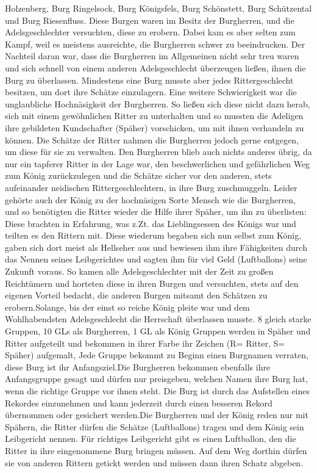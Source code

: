 Holzenberg, Burg Ringelsock, Burg Königsfels, Burg Schönstett, Burg Schützental und Burg Riesenfluss. Diese Burgen waren im Besitz der Burgherren, und die Adelsgeschlechter versuchten, diese zu erobern. Dabei kam es aber selten zum Kampf, weil es meistens ausreichte, die Burgherren schwer zu beeindrucken. Der Nachteil daran war, dass die Burgherren im Allgemeinen nicht sehr treu waren und sich schnell von einem anderen Adelsgeschlecht überzeugen ließen, ihnen die Burg zu überlassen. Mindestens eine Burg musste aber jedes Rittergeschlecht besitzen, um dort ihre Schätze einzulagern. Eine weitere Schwierigkeit war die unglaubliche Hochnäsigkeit der Burgherren. So ließen sich diese nicht dazu herab, sich mit einem gewöhnlichen Ritter zu unterhalten und so mussten die Adeligen ihre gebildeten Kundschafter (Späher) vorschicken, um mit ihnen verhandeln zu können.  Die Schätze der Ritter nahmen die Burgherren jedoch gerne entgegen, um diese für sie zu verwalten. Den Burgherren blieb auch nichts anderes übrig, da nur ein tapferer Ritter in der Lage war, den beschwerlichen und gefährlichen Weg zum König zurückzulegen und die Schätze sicher vor den anderen, stets aufeinander neidischen Rittergeschlechtern, in ihre Burg zuschmuggeln. Leider gehörte auch der König zu der hochnäsigen Sorte Mensch wie die Burgherren, und so benötigten die Ritter wieder die Hilfe ihrer Späher, um ihn zu überlisten: Diese brachten in Erfahrung, was z.Zt. das Lieblingsessen des Königs war und teilten es den Rittern mit. Diese wiederum begaben sich nun selbst zum König, gaben sich dort meist als Hellseher aus und bewiesen ihm ihre Fähigkeiten durch das Nennen seines Leibgerichtes und sagten ihm für viel Geld (Luftballons) seine Zukunft voraus. So kamen alle Adelsgeschlechter mit der Zeit zu großen Reichtümern und horteten diese in ihren Burgen und versuchten, stets auf den eigenen Vorteil bedacht, die anderen Burgen mitsamt den Schätzen zu erobern.Solange, bis der einst so reiche König pleite war und dem Wohlhabendsten Adelsgeschlecht die Herrschaft überlassen musste. 8 gleich starke Gruppen, 10 GLs als Burgherren, 1 GL als König Gruppen werden in Späher und Ritter aufgeteilt und bekommen in ihrer Farbe ihr Zeichen (R= Ritter, S= Späher) aufgemalt, Jede Gruppe bekommt zu Beginn einen Burgnamen verraten, diese Burg ist ihr Anfangsziel.Die Burgherren bekommen ebenfalls ihre Anfangsgruppe gesagt und dürfen nur preisgeben, welchen Namen ihre Burg hat, wenn die richtige Gruppe vor ihnen steht. Die Burg ist durch das Aufstellen eines Rekordes einzunehmen und kann jederzeit durch einen besseren Rekord übernommen oder gesichert werden.Die Burgherren und der König reden nur mit Spähern, die Ritter dürfen die Schätze (Luftballons) tragen und dem König sein Leibgericht nennen. Für richtiges Leibgericht gibt es einen Luftballon, den die Ritter in ihre eingenommene Burg bringen müssen. Auf dem Weg dorthin dürfen sie von anderen Rittern getickt werden und müssen dann ihren Schatz abgeben.
